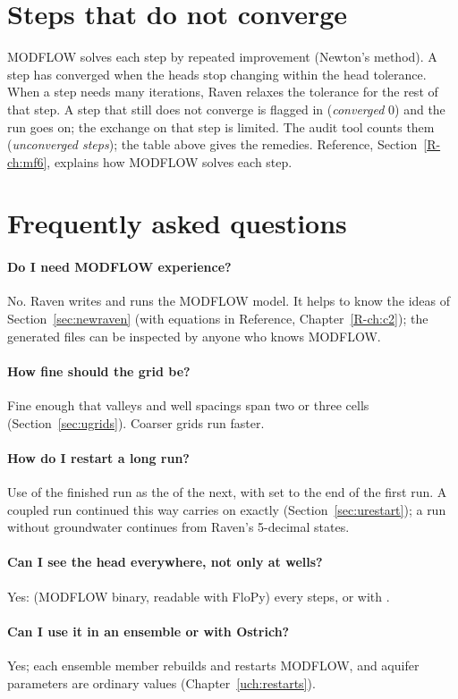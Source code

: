 \section{Steps that do not converge}
MODFLOW solves each step by repeated improvement (Newton's method). A step has converged when the heads stop changing
within the head tolerance. When a step needs many iterations, Raven relaxes the tolerance for the rest of that step. A
step that still does not converge is flagged in  (\emph{converged} 0) and the run goes on; the
exchange on that step is limited. The audit tool counts them (\emph{unconverged steps}); the table above gives the
remedies. Reference, Section~\ref{R-ch:mf6}, explains how MODFLOW solves each step.

\section{Frequently asked questions}
\paragraph{Do I need MODFLOW experience?} No. Raven writes and runs the MODFLOW model. It helps to know the ideas of
Section~\ref{sec:newraven} (with equations in Reference, Chapter~\ref{R-ch:c2}); the generated files can be inspected by
anyone who knows MODFLOW.
\paragraph{How fine should the grid be?} Fine enough that valleys and well spacings span two or three cells
(Section~\ref{sec:ugrids}). Coarser grids run faster.
\paragraph{How do I restart a long run?} Use  of the finished run as the  of the next, with
 set to the end of the first run. A coupled run continued this way carries on exactly
(Section~\ref{sec:urestart}); a run without groundwater continues from Raven's 5-decimal states.
\paragraph{Can I see the head everywhere, not only at wells?} Yes:  (MODFLOW binary, readable with FloPy)
every  steps, or  with .
\paragraph{Can I use it in an ensemble or with Ostrich?} Yes; each ensemble member rebuilds and restarts MODFLOW, and
aquifer parameters are ordinary  values (Chapter~\ref{uch:restarts}).
